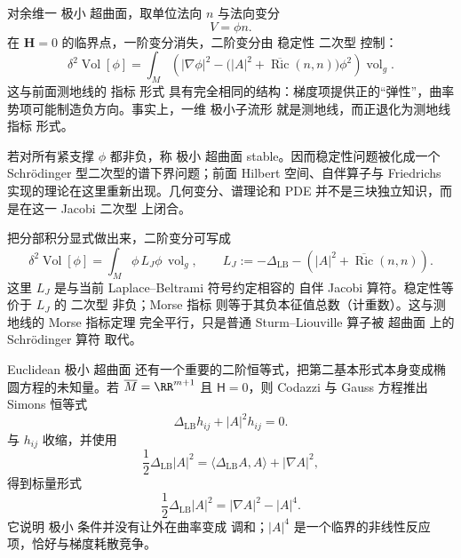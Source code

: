 对余维一 极小 超曲面，取单位法向 $n$ 与法向变分
\[
V=\phi n.
\]
在 $\mathbf H=0$ 的临界点，一阶变分消失，二阶变分由 稳定性 二次型 控制：
\begin{equation}
\boxed{
\delta^2\operatorname{Vol}[\phi]
=
\int_M
\left(
|\nabla\phi|^2
-\bigl(|A|^2+\overline{\operatorname{Ric}}(n,n)\bigr)\phi^2
\right)\operatorname{vol}_g
}.
\label{eq:math-dg-minimal-second-variation}
\end{equation}
这与前面测地线的 指标 形式 具有完全相同的结构：梯度项提供正的``弹性''，曲率势项可能制造负方向。事实上，一维 极小子流形 就是测地线，而正退化为测地线 指标 形式。

若对所有紧支撑 $\phi$ 都非负，称 极小 超曲面 stable。因而稳定性问题被化成一个 Schrödinger 型二次型的谱下界问题；前面 Hilbert 空间、自伴算子与 Friedrichs 实现的理论在这里重新出现。几何变分、谱理论和 PDE 并不是三块独立知识，而是在这一 Jacobi 二次型 上闭合。

把分部积分显式做出来，二阶变分可写成
\begin{equation*}\delta^2\operatorname{Vol}[\phi]
=\int_M\phi\,L_J\phi\,\operatorname{vol}_g,
\qquad
L_J:=-\Delta_{\mathrm{LB}}
-\left(|A|^2+\overline{\operatorname{Ric}}(n,n)\right).\end{equation*}
这里 $L_J$ 是与当前 Laplace--Beltrami 符号约定相容的 自伴 Jacobi 算符。稳定性等价于 $L_J$ 的 二次型 非负；Morse 指标 则等于其负本征值总数（计重数）。这与测地线的 Morse 指标定理 完全平行，只是普通 Sturm--Liouville 算子被 超曲面 上的 Schrödinger 算符 取代。

Euclidean 极小 超曲面 还有一个重要的二阶恒等式，把第二基本形式本身变成椭圆方程的未知量。若 $\overline M=\RR^{m+1}$ 且 $\mathsf H=0$，则 Codazzi 与 Gauss 方程推出 Simons 恒等式
\begin{equation}
\boxed{
\Delta_{\mathrm{LB}}h_{ij}
+|A|^2h_{ij}=0.
}
\label{eq:math-dg-simons-hessian}
\end{equation}
与 $h_{ij}$ 收缩，并使用
\[
\frac12\Delta_{\mathrm{LB}}|A|^2
=\langle\Delta_{\mathrm{LB}}A,A\rangle
+|\nabla A|^2,
\]
得到标量形式
\begin{equation*}\boxed{
\frac12\Delta_{\mathrm{LB}}|A|^2
=|\nabla A|^2-|A|^4.
}\end{equation*}
它说明 极小 条件并没有让外在曲率变成 调和；$|A|^4$ 是一个临界的非线性反应项，恰好与梯度耗散竞争。

